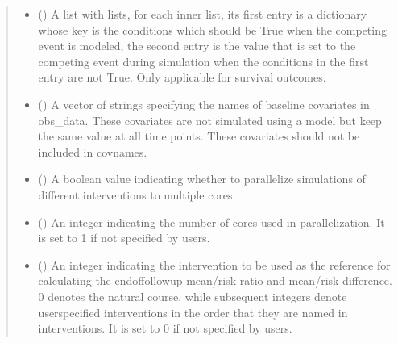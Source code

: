 \documentclass[letterpaper,10pt,english]{sphinxmanual}
\begin{document}
\begin{fulllineitems}
\begin{quote}
\begin{description}
\begin{itemize}
\item {} 
\sphinxAtStartPar
{} (\sphinxstyleliteralemphasis{\sphinxupquote{, }}) \textendash{} A list with lists, for each inner list, its first entry is a dictionary whose key is the conditions which
should be True when the competing event is modeled, the second entry is the value that is set to the competing
event during simulation when the conditions in the first entry are not True. Only applicable for survival outcomes.

\item {} 
\sphinxAtStartPar
{} (\sphinxstyleliteralemphasis{\sphinxupquote{, }}) \textendash{} A vector of strings specifying the names of baseline covariates in obs\_data. These covariates are not
simulated using a model but keep the same value at all time points. These covariates should not be included
in covnames.

\item {} 
\sphinxAtStartPar
{} (\sphinxstyleliteralemphasis{\sphinxupquote{, }}) \textendash{} A boolean value indicating whether to parallelize simulations of different interventions to multiple cores.

\item {} 
\sphinxAtStartPar
{} (\sphinxstyleliteralemphasis{\sphinxupquote{, }}) \textendash{} An integer indicating the number of cores used in parallelization. It is set to 1 if not specified by users.

\item {} 
\sphinxAtStartPar
{} (\sphinxstyleliteralemphasis{\sphinxupquote{, }}) \textendash{} An integer indicating the intervention to be used as the reference for calculating the end\sphinxhyphen{}of\sphinxhyphen{}follow\sphinxhyphen{}up mean/risk
ratio and mean/risk difference. 0 denotes the natural course, while subsequent integers denote user\sphinxhyphen{}specified
interventions in the order that they are named in interventions. It is set to 0 if not specified by users.


\end{itemize}
\end{description}
\end{quote}
\end{fulllineitems}
\end{document}
